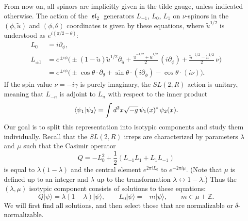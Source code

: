 \documentclass[11pt]{article}
\newcommand*{\ket}[1]{|{#1}\rangle}
\newcommand*{\braket}[2]{\langle{#1}|{#2}\rangle}
\newcommand{\ZZ}{\mathbb{Z}}
\newcommand{\RR}{\mathbb{R}}
\DeclareMathOperator{\SL}{SL}
\DeclareMathOperator{\sL}{\mathfrak{sl}}
\newcommand{\tu}{\tilde{u}}
\def\widetilde#1{#1}%
\def\SL{SL}
\def\RR{R}
\begin{document}
From now on, all spinors are implicitly given in the tilde gauge, unless indicated otherwise.
The action of the $\sL_2$ generators $L_{-1}$, $L_{0}$, $L_{1}$ on $\nu$-spinors in the $(\phi,\tu)$ and $(\phi,\theta)$ coordinates is given by these equations, where $\tu^{1/2}$ is understood as $e^{i(\pi/2-\theta)}$:
\begin{equation} \label{sl2gen}
\begin{aligned}
L_0&=i\partial_{\phi},\\[6pt]
L_{\pm1}&=e^{\pm i\phi}
\biggl(\pm(1-\tu)\tu^{1/2}\partial_{\tu}
+\frac{\tu^{-1/2}+\tu^{1/2}}{2}\,(i\partial_{\phi})
+\frac{\tu^{-1/2}-\tu^{1/2}}{2}\,\nu\biggr)\\[3pt]
&=e^{\pm i\phi}
\bigl(\pm\cos\theta\cdot\partial_{\theta}
+\sin\theta\cdot(i\partial_{\phi})-\cos\theta\cdot(i\nu)\bigr).
\end{aligned}
\end{equation}
If the spin value $\nu=-i\gamma$ is purely imaginary, the $\widetilde{\SL}(2,\RR)$ action is unitary, meaning that $L_{-n}$ is adjoint to $L_{n}$ with respect to the inner product
\begin{equation}\label{ip_AdS}
\braket{\psi_1}{\psi_2}=\int d^2 x \sqrt{-g}\,\psi_1(x)^*\kern1pt \psi_2(x).
\end{equation}
Our goal is to split this representation into isotypic components and study them individually. Recall that the $\widetilde{\SL}(2,\RR)$ irreps are characterized by parameters $\lambda$ and $\mu$ such that the Casimir operator
\begin{equation} \label{Qdef}
Q=-L_0^2+\frac{1}{2}(L_{-1}L_1+L_1L_{-1})
\end{equation}
is equal to $\lambda(1-\lambda)$ and the central element $e^{2\pi iL_0}$ to  $e^{-2\pi i\mu}$. (Note that $\mu$ is defined up to an integer and $\lambda$ up to the transformation $\lambda\leftrightarrow 1-\lambda$.) Thus the $(\lambda,\mu)$ isotypic component consists of solutions to these equations:
\begin{equation} \label{compeq}
Q\ket{\psi}=\lambda(1-\lambda)\ket{\psi},\qquad
L_0\ket{\psi}=-m\ket{\psi},\qquad m\in\mu+\ZZ.
\end{equation}
We will first find all solutions, and then select those that are normalizable or $\delta$-normalizable. 
\end{document}

